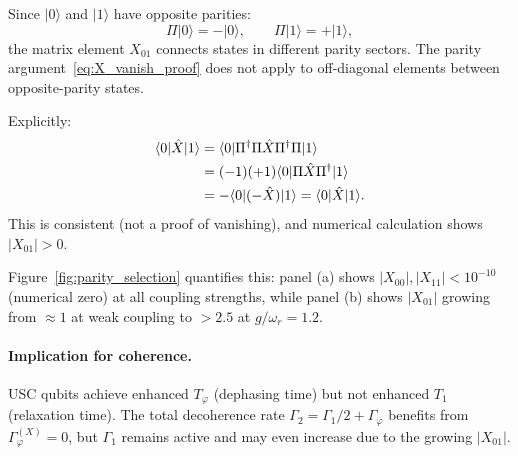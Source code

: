 \documentclass[reprint, floatfix, superscriptaddress, amsmath, amssymb, longbibliography]{revtex4-2}
\begin{document}
Since $|0\rangle$ and $|1\rangle$ have opposite parities:
\begin{equation}
\Pi|0\rangle = -|0\rangle, \qquad \Pi|1\rangle = +|1\rangle,
\label{eq:ground_excited_parity}
\end{equation}
the matrix element $X_{01}$ connects states in different parity sectors. The parity argument~\eqref{eq:X_vanish_proof} does not apply to off-diagonal elements between opposite-parity states.

Explicitly:
\begin{align}
\langle 0|\hat{X}|1\rangle &= \langle 0|\Pi^\dagger\Pi\hat{X}\Pi^\dagger\Pi|1\rangle \notag \\
&= (-1)(+1)\langle 0|\Pi\hat{X}\Pi^\dagger|1\rangle \notag \\
&= -\langle 0|(-\hat{X})|1\rangle = \langle 0|\hat{X}|1\rangle.
\label{eq:X01_check}
\end{align}
This is consistent (not a proof of vanishing), and numerical calculation shows $|X_{01}| > 0$.

Figure~\ref{fig:parity_selection} quantifies this: panel (a) shows $|X_{00}|, |X_{11}| < 10^{-10}$ (numerical zero) at all coupling strengths, while panel (b) shows $|X_{01}|$ growing from $\approx 1$ at weak coupling to $> 2.5$ at $g/\omega_r = 1.2$.

\paragraph{Implication for coherence.} USC qubits achieve enhanced $T_\varphi$ (dephasing time) but not enhanced $T_1$ (relaxation time). The total decoherence rate $\Gamma_2 = \Gamma_1/2 + \Gamma_\varphi$ benefits from $\Gamma_\varphi^{(X)} = 0$, but $\Gamma_1$ remains active and may even increase due to the growing $|X_{01}|$.
\end{document}
